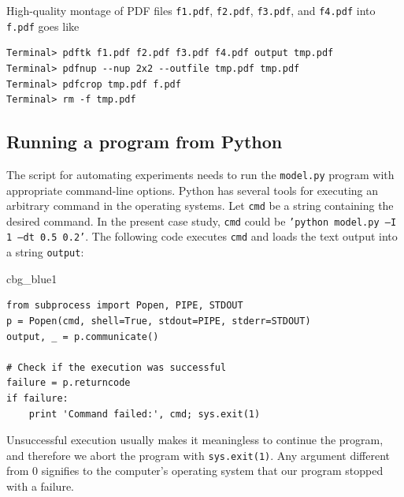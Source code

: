 \documentclass[%
oneside,                 %
final,                   %
10pt]{article}
\newenvironment{_cod_tight}[1]{
   \def\FrameCommand{\colorbox{#1}}
   \FrameRule0.6pt\MakeFramed {\FrameRestore}\vskip3mm}
   {\vskip0mm\endMakeFramed}
\newenvironment{cod}[1]{
\bgroup\rmfamily
\fboxsep=0mm\relax
\begin{_cod_tight}{#1}
\list{}{\parsep=-2mm\parskip=0mm\topsep=0pt\leftmargin=2mm
\rightmargin=2\leftmargin\leftmargin=4pt\relax}
\item\relax}
{\endlist\end{_cod_tight}\egroup}
\begin{document}
High-quality montage of PDF files \texttt{f1.pdf},
\texttt{f2.pdf}, \texttt{f3.pdf}, and \texttt{f4.pdf} into \texttt{f.pdf} goes like

\begin{Verbatim}[frame=lines,label=\fbox{{\tiny Terminal}},framesep=2.5mm,framerule=0.7pt,fontsize=\fontsize{9pt}{9pt}]
Terminal> pdftk f1.pdf f2.pdf f3.pdf f4.pdf output tmp.pdf
Terminal> pdfnup --nup 2x2 --outfile tmp.pdf tmp.pdf
Terminal> pdfcrop tmp.pdf f.pdf
Terminal> rm -f tmp.pdf
\end{Verbatim}

\subsection{Running a program from Python}

The script for automating experiments needs to run the \texttt{model.py} program
with appropriate command-line options. Python has several tools for
executing an arbitrary command in the operating systems.
Let \texttt{cmd} be a string containing the desired command.
In the present case study, \texttt{cmd} could be \texttt{'python model.py --I 1 --dt 0.5 0.2'}.
The following code
executes \texttt{cmd} and loads the text output into a string \texttt{output}:

\begin{cod}{cbg_blue1}\begin{Verbatim}[numbers=none,fontsize=\fontsize{9pt}{9pt},baselinestretch=0.95,xleftmargin=2mm]
from subprocess import Popen, PIPE, STDOUT
p = Popen(cmd, shell=True, stdout=PIPE, stderr=STDOUT)
output, _ = p.communicate()

# Check if the execution was successful
failure = p.returncode
if failure:
    print 'Command failed:', cmd; sys.exit(1)
\end{Verbatim}
\end{cod}
\noindent
Unsuccessful execution usually makes it meaningless to continue
the program, and therefore we abort the program with \texttt{sys.exit(1)}.
Any argument different from 0 signifies to the computer's operating system
that our program stopped with a failure.
\end{document}
